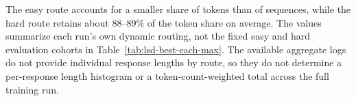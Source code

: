 \begin{table}[htbp]
  \centering
  \caption{\textbf{Training-route allocation over steps 501--1628.}
  The first three numeric columns are means of logged per-step
  fractions, expressed in percent. The last reports the median and
  interquartile range of the easy-token share.}
  \label{tab:training-token-routes}
  \small
\end{table}

The easy route accounts for a smaller share of tokens than of
sequences, while the hard route retains about 88--89\% of the token
share on average. The values summarize each run's own dynamic routing,
not the fixed easy and hard evaluation cohorts in
Table~\ref{tab:lsd-best-each-max}. The available aggregate logs do not
provide individual response lengths by route, so they do not determine
a per-response length histogram or a token-count-weighted total across
the full training run.
